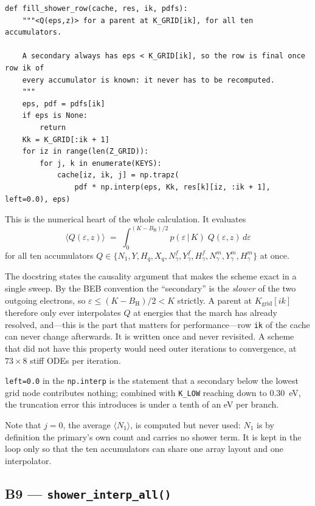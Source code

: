 \documentclass[11pt,a4paper]{article}
\newcommand{\code}[1]{\texttt{\small #1}}
\newcommand{\eps}{\varepsilon}
\newcommand{\BH}{B_{\mathrm{H}}}
\begin{document}
\begin{lstlisting}
def fill_shower_row(cache, res, ik, pdfs):
    """<Q(eps,z)> for a parent at K_GRID[ik], for all ten accumulators.

    A secondary always has eps < K_GRID[ik], so the row is final once row ik of
    every accumulator is known: it never has to be recomputed.
    """
    eps, pdf = pdfs[ik]
    if eps is None:
        return
    Kk = K_GRID[:ik + 1]
    for iz in range(len(Z_GRID)):
        for j, k in enumerate(KEYS):
            cache[iz, ik, j] = np.trapz(
                pdf * np.interp(eps, Kk, res[k][iz, :ik + 1], left=0.0), eps)
\end{lstlisting}

This is the numerical heart of the whole calculation.  It evaluates
\[
  \bigl\langle Q(\eps,z)\bigr\rangle \;=\;
  \int_0^{(K-\BH)/2} p(\eps\,|\,K)\; Q(\eps,z)\, d\eps
\]
for all ten accumulators $Q \in \{N_1, Y, H_q, X_q, N_\gamma^{f}, Y_\gamma^{f},
H_\gamma^{f}, N_\gamma^{m}, Y_\gamma^{m}, H_\gamma^{m}\}$ at once.

The docstring states the causality argument that makes the scheme exact in a
single sweep.  By the BEB convention the ``secondary'' is the \emph{slower} of
the two outgoing electrons, so $\eps \le (K-\BH)/2 < K$ strictly.  A parent at
$K_{\mathrm{grid}}[ik]$ therefore only ever interpolates $Q$ at energies that
the march has already resolved, and---this is the part that matters for
performance---row \code{ik} of the cache can never change afterwards.  It is
written once and never revisited.  A scheme that did not have this property
would need outer iterations to convergence, at $73\times 8$ stiff ODEs per
iteration.

\code{left=0.0} in the \code{np.interp} is the statement that a secondary below
the lowest grid node contributes nothing; combined with \code{K\_LOW} reaching
down to 0.30~eV, the truncation error this introduces is under a tenth of an eV
per branch.

Note that $j=0$, the average $\langle N_1\rangle$, is computed but never used:
$N_1$ is by definition the primary's own count and carries no shower term.  It
is kept in the loop only so that the ten accumulators can share one array
layout and one interpolator.

\subsection*{B9 --- \code{shower\_interp\_all()}}
\end{document}
